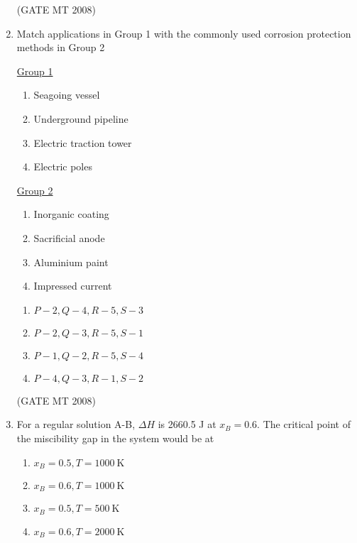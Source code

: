 \documentclass[journal, 11pt, onecolumn]{IEEEtran}
\theoremstyle{remark}
\begin{document}
\begin{enumerate}
\hfill(GATE MT 2008)

\item Match applications in Group 1 with the commonly used corrosion protection methods in Group 2
\begin{multicols}{2}
\underline{Group 1}
\begin{enumerate}[label=(\Alph*), start=16]
\item Seagoing vessel
\item Underground pipeline
\item Electric traction tower
\item Electric poles
\end{enumerate}

\underline{Group 2}
\begin{enumerate}[label=(\arabic*), start=1]
\item Inorganic coating
\item Sacrificial anode
\item Aluminium paint
\item Impressed current
\end{enumerate}
\end{multicols}

\begin{multicols}{2}
\begin{enumerate}
\item $P-2, Q-4, R-5, S-3$
\item $P-2, Q-3, R-5, S-1$
\item $P-1, Q-2, R-5, S-4$
\item $P-4, Q-3, R-1, S-2$
\end{enumerate}
\end{multicols}
\hfill(GATE MT 2008) 

\item For a regular solution A-B, $\Delta H$ is 2660.5 J at $x_B = 0.6$. The critical point of the miscibility gap in the system would be at

\begin{multicols}{2}
\begin{enumerate}
\item $x_B = 0.5, T = 1000 \ \mathrm{K}$
\item $x_B = 0.6, T = 1000 \ \mathrm{K}$
\item $x_B = 0.5, T = 500 \ \mathrm{K}$
\item $x_B = 0.6, T = 2000 \ \mathrm{K}$
\end{enumerate}
\end{multicols}


\end{enumerate}
\end{document}
